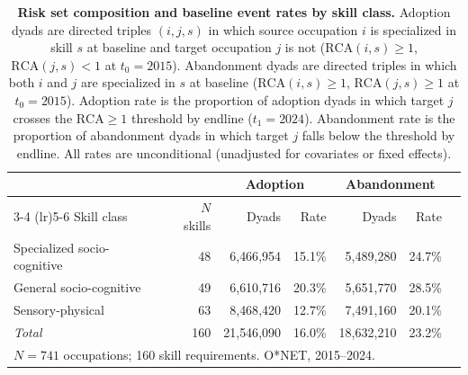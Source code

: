 \begin{table}[H]
\centering
\caption{\textbf{Risk set composition and baseline event rates by skill class.} Adoption dyads are directed triples $(i,j,s)$ in which source occupation $i$ is specialized in skill $s$ at baseline and target occupation $j$ is not ($\mathrm{RCA}(i,s) \geq 1$, $\mathrm{RCA}(j,s) < 1$ at $t_0 = 2015$). Abandonment dyads are directed triples in which both $i$ and $j$ are specialized in $s$ at baseline ($\mathrm{RCA}(i,s) \geq 1$, $\mathrm{RCA}(j,s) \geq 1$ at $t_0 = 2015$). Adoption rate is the proportion of adoption dyads in which target $j$ crosses the $\mathrm{RCA} \geq 1$ threshold by endline ($t_1 = 2024$). Abandonment rate is the proportion of abandonment dyads in which target $j$ falls below the threshold by endline. All rates are unconditional (unadjusted for covariates or fixed effects).}
\label{tab:SI_riskset_desc}
\renewcommand{\arraystretch}{1.15}
\begin{tabular}{lrrrrrr}
\toprule
 & & \multicolumn{2}{c}{Adoption} & \multicolumn{2}{c}{Abandonment} \\
\cmidrule(lr){3-4} \cmidrule(lr){5-6}
Skill class & $N$ skills & Dyads & Rate & Dyads & Rate \\
\midrule
Specialized socio-cognitive &  48 & 6{,}466{,}954 & 15.1\% & 5{,}489{,}280 & 24.7\% \\
General socio-cognitive     &  49 & 6{,}610{,}716 & 20.3\% & 5{,}651{,}770 & 28.5\% \\
Sensory-physical            &  63 & 8{,}468{,}420 & 12.7\% & 7{,}491{,}160 & 20.1\% \\
\midrule
\textit{Total}              & 160 & 21{,}546{,}090 & 16.0\% & 18{,}632{,}210 & 23.2\% \\
\bottomrule
\multicolumn{6}{l}{\footnotesize $N = 741$ occupations; 160 skill requirements. O*NET, 2015--2024.}
\end{tabular}
\end{table}
